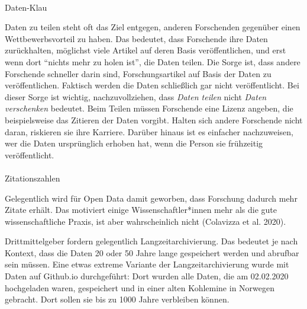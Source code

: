 \documentclass[
  letterpaper,
  DIV=11,
  numbers=noendperiod]{scrreprt}
\makeatletter
\let\oldparagraph\paragraph
\renewcommand{\paragraph}{
    \@ifstar
      \xxxParagraphStar
      \xxxParagraphNoStar
  }
\newcommand{\xxxParagraphStar}[1]{\oldparagraph*{#1}\mbox{}}
\newcommand{\xxxParagraphNoStar}[1]{\oldparagraph{#1}\mbox{}}
\makeatother
\begin{document}
\paragraph{Daten-Klau}\label{daten-klau}

Daten zu teilen steht oft das Ziel entgegen, anderen Forschenden
gegenüber einen Wettbewerbsvorteil zu haben. Das bedeutet, dass
Forschende ihre Daten zurückhalten, möglichst viele Artikel auf deren
Basis veröffentlichen, und erst wenn dort ``nichts mehr zu holen ist'',
die Daten teilen. Die Sorge ist, dass andere Forschende schneller darin
sind, Forschungsartikel auf Basis der Daten zu veröffentlichen. Faktisch
werden die Daten schließlich gar nicht veröffentlicht. Bei dieser Sorge
ist wichtig, nachzuvollziehen, dass \emph{Daten teilen} nicht
\emph{Daten verschenken} bedeutet. Beim Teilen müssen Forschende eine
Lizenz angeben, die beispielsweise das Zitieren der Daten vorgibt.
Halten sich andere Forschende nicht daran, riskieren sie ihre Karriere.
Darüber hinaus ist es einfacher nachzuweisen, wer die Daten ursprünglich
erhoben hat, wenn die Person sie frühzeitig veröffentlicht.

\paragraph{Zitationszahlen}\label{zitationszahlen}

Gelegentlich wird für Open Data damit geworben, dass Forschung dadurch
mehr Zitate erhält. Das motiviert einige Wissenschaftler*innen mehr als
die gute wissenschaftliche Praxis, ist aber wahrscheinlich nicht
(Colavizza et al. 2020).

\begin{tcolorbox}[enhanced jigsaw, left=2mm, colback=white, colframe=quarto-callout-note-color-frame, opacitybacktitle=0.6, opacityback=0, title=\textcolor{quarto-callout-note-color}{\faInfo}\hspace{0.5em}{Was bedeutet Langzeitarchivierung?}, toptitle=1mm, coltitle=black, colbacktitle=quarto-callout-note-color!10!white, titlerule=0mm, bottomtitle=1mm, leftrule=.75mm, breakable, rightrule=.15mm, bottomrule=.15mm, toprule=.15mm, arc=.35mm]

Drittmittelgeber fordern gelegentlich Langzeitarchivierung. Das bedeutet
je nach Kontext, dass die Daten 20 oder 50 Jahre lange gespeichert
werden und abrufbar sein müssen. Eine etwas extreme Variante der
Langzeitarchivierung wurde mit Daten auf Github.io durchgeführt: Dort
wurden alle Daten, die am 02.02.2020 hochgeladen waren, gespeichert und
in einer alten Kohlemine in Norwegen gebracht. Dort sollen sie bis zu
1000 Jahre verbleiben können.

\end{tcolorbox}
\end{document}
